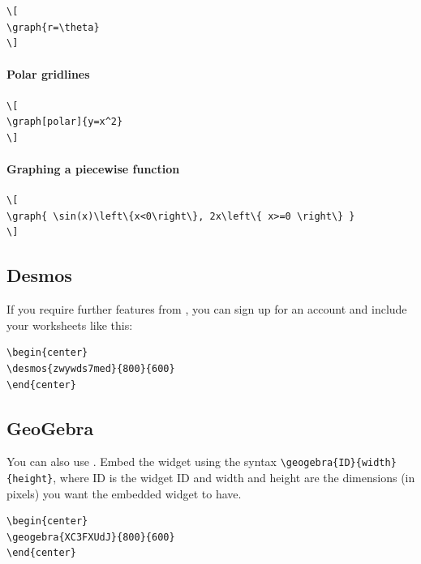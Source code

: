 \documentclass{ximera}
\begin{document}
  
\begin{verbatim}
\[
\graph{r=\theta}
\]
\end{verbatim}
\paragraph{Polar gridlines}


\begin{verbatim}
\[
\graph[polar]{y=x^2}
\]
\end{verbatim}
\paragraph{Graphing a piecewise function}


\begin{verbatim}
\[
\graph{ \sin(x)\left\{x<0\right\}, 2x\left\{ x>=0 \right\} }
\]
\end{verbatim}


\subsection{Desmos}

If you require further features from
, you can sign up for an account
and include your worksheets like this:

\begin{verbatim}
\begin{center}
\desmos{zwywds7med}{800}{600}
\end{center}
\end{verbatim}
\begin{center}
\end{center}


\subsection{GeoGebra}

You can also use . Embed the
widget using the syntax \verb|\geogebra{ID}{width}{height}|, where ID
is the widget ID and width and height are the dimensions (in pixels)
you want the embedded widget to have.
\begin{center}
\end{center}

\begin{verbatim}
\begin{center}
\geogebra{XC3FXUdJ}{800}{600}
\end{center}
\end{verbatim}
\end{document}
